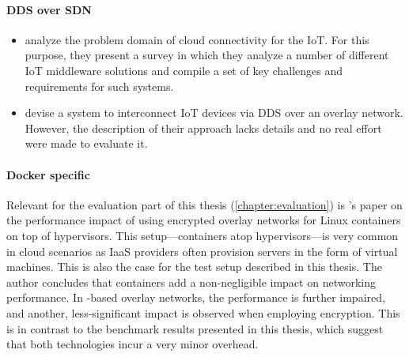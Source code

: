 \paragraph{DDS over SDN}
\begin{itemize}
	\item \citeauthor*{farahzadi2017middleware} \cite{farahzadi2017middleware} analyze the problem domain of cloud connectivity for the IoT. For this purpose, they present a survey in which they analyze a number of different IoT middleware solutions and compile a set of key challenges and requirements for such systems.
	\item \citeauthor*{hakiri2015publish} \cite{hakiri2015publish} devise a system to interconnect IoT devices via DDS over an overlay network. However, the description of their approach lacks details and no real effort were made to evaluate it.
\end{itemize}


\paragraph{Docker specific}
Relevant for the evaluation part of this thesis (\autoref{chapter:evaluation}) is \citeauthor*{kratzke2017microservices}'s paper \cite{kratzke2017microservices} on the performance impact of using encrypted overlay networks for Linux containers on top of hypervisors. This setup---containers atop hypervisors---is very common in cloud scenarios as IaaS providers often provision servers in the form of virtual machines. This is also the case for the test setup described in this thesis. The author concludes that containers add a non-negligible impact on networking performance. In \wnet -based overlay networks, the performance is further impaired, and another, less-significant impact is observed when employing encryption. This is in contrast to the benchmark results presented in this thesis, which suggest that both technologies incur a very minor overhead.




